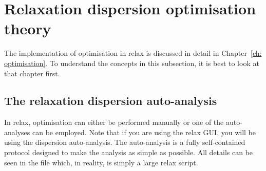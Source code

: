 
\section{Relaxation dispersion optimisation theory}

The implementation of optimisation in relax is discussed in detail in Chapter~\ref{ch: optimisation}.
To understand the concepts in this subsection, it is best to look at that chapter first.



\subsection{The relaxation dispersion auto-analysis}

In relax, optimisation can either be performed manually or one of the auto-analyses can be employed.
Note that if you are using the relax GUI, you will be using the dispersion auto-analysis.
The auto-analysis is a fully self-contained protocol designed to make the analysis as simple as possible.
All details can be seen in the  file which, in reality, is simply a large relax script.

